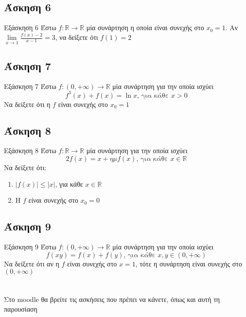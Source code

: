 \documentclass[greek]{beamer}
\begin{document}
\subsection{Άσκηση 6}
\begin{frame}[label=Άσκηση6]{Εξάσκηση 6}
 Έστω $f:\mathbb{R}\to\mathbb{R}$ μία συνάρτηση η οποία είναι συνεχής στο $x_0=1$. Αν $\lim\limits_{x \to 1}{ \frac{f(x)-2}{x-1} }=3$, να δείξετε ότι $f(1)=2$

\end{frame}

\subsection{Άσκηση 7}
\begin{frame}[label=Άσκηση7]{Εξάσκηση 7}
 Έστω $f:(0,+\infty)\to\mathbb{R}$ μία συνάρτηση για την οποία ισχύει
 $$f^3(x)+f(x)=\ln x \text{, για κάθε } x>0$$
 Να δείξετε ότι η $f$ είναι συνεχής στο $x_0=1$

\end{frame}

\subsection{Άσκηση 8}
\begin{frame}[label=Άσκηση8]{Εξάσκηση 8}
 Έστω $f:\mathbb{R}\to\mathbb{R}$ μία συνάρτηση για την οποία ισχύει
 $$2f(x)=x+ημf(x) \text{, για κάθε } x\in\mathbb{R}$$
 Να δείξετε ότι:
 \begin{enumerate}
  \item<1-> $|f(x)|\le |x|$, για κάθε $x\in\mathbb{R}$
  \item<2-> Η $f$ είναι συνεχής στο $x_0=0$
 \end{enumerate}

\end{frame}

\subsection{Άσκηση 9}
\begin{frame}[label=Άσκηση9]{Εξάσκηση 9}
 Έστω $f:(0,+\infty)\to\mathbb{R}$ μία συνάρτηση για την οποία ισχύει
 $$f(xy)=f(x)+f(y) \text{, για κάθε } x,y\in(0,+\infty)$$
 Να δείξετε ότι αν η $f$ είναι συνεχής στο $x=1$, τότε η συνάρτηση είναι συνεχής στο $(0,+\infty)$

\end{frame}

\section{}
\begin{frame}
 Στο moodle θα βρείτε τις ασκήσεις που πρέπει να κάνετε, όπως και αυτή τη παρουσίαση
\end{frame}
\end{document}

